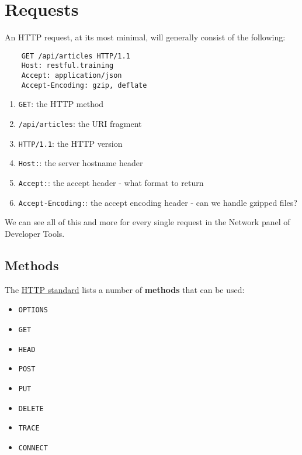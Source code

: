 \pagebreak


\section{Requests}

An HTTP request, at its most minimal, will generally consist of the following:

\begin{verbatim}
    GET /api/articles HTTP/1.1
    Host: restful.training
    Accept: application/json
    Accept-Encoding: gzip, deflate
\end{verbatim}

\begin{enumerate}[leftmargin=*]
    \item \texttt{GET}: the HTTP method
    \item \texttt{/api/articles}: the URI fragment
    \item \texttt{HTTP/1.1}: the HTTP version
    \item \texttt{Host:}: the server hostname header
    \item \texttt{Accept:}: the accept header - what format to return
    \item \texttt{Accept-Encoding:}: the accept encoding header - can we handle gzipped files?
\end{enumerate}

We can see all of this and more for every single request in the Network panel of Developer Tools.


\subsection{Methods}

The \href{https://www.w3.org/Protocols/rfc2616/rfc2616.txt}{HTTP standard} lists a number of \textbf{methods} that can be used:

\begin{itemize}
    \item \texttt{OPTIONS}
    \item \texttt{GET}
    \item \texttt{HEAD}
    \item \texttt{POST}
    \item \texttt{PUT}
    \item \texttt{DELETE}
    \item \texttt{TRACE}
    \item \texttt{CONNECT}
\end{itemize}

